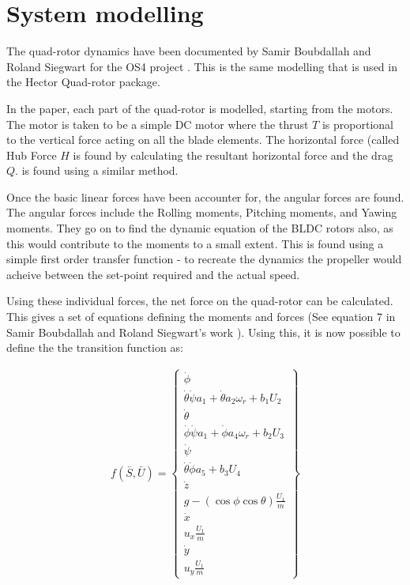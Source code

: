 \documentclass[BTech]{iitmdiss}
\begin{document}
\section{System modelling}

The quad-rotor dynamics have been documented by Samir Boubdallah and Roland Siegwart for the OS4 project \cite{QuadrotorDynamics}. This is the same modelling that is used in the Hector Quad-rotor package.

In the paper, each part of the quad-rotor is modelled, starting from the motors. The motor is taken to be a simple DC motor where the thrust $T$ is proportional to the vertical force acting on all the blade elements. The horizontal force (called Hub Force $H$ is found by calculating the resultant horizontal force and the drag $Q$. is found using a similar method.

Once the basic linear forces have been accounter for, the angular forces are found. The angular forces include the Rolling moments, Pitching moments, and Yawing moments. They go on to find the dynamic equation of the BLDC rotors also, as this would contribute to the moments to a small extent. This is found using a simple first order transfer function - to recreate the dynamics the propeller would acheive between the set-point required and the actual speed.

Using these individual forces, the net force on the quad-rotor can be calculated. This gives a set of equations defining the moments and forces (See equation 7 in Samir Boubdallah and Roland Siegwart's work \cite{QuadrotorDynamics}). Using this, it is now possible to define the the transition function as:

\begin{equation} \begin{split}
  f(\bar{S}, \bar{U}) = \left\{
    \begin{array}{c}
      \dot{\phi} \\
      \dot{\theta} \dot{\psi} a_{1} + \dot{\theta} a_{2} \omega_{r} + b_{1} U_{2} \\
      \dot{\theta} \\
      \dot{\phi} \dot{\psi} a_{1} + \dot{\phi} a_{4} \omega_{r} + b_{2} U_{3} \\
      \dot{\psi} \\
      \dot{\theta} \dot{\phi} a_{5} + b_{3} U_{4} \\
      \dot{z} \\
      g  - (\cos{\phi} \cos{\theta})\frac{U_{1}}{m} \\
      \dot{x} \\
      u_{x} \frac{U_{1}}{m} \\
      \dot{y} \\
      u_{y} \frac{U_{1}}{m}
    \end{array}
  \right\}
\end{split} \end{equation}
\end{document}
